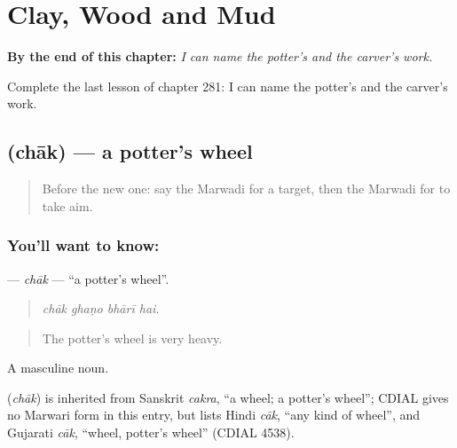 
\chapter{Clay, Wood and Mud}
\label{ch:mw-clay-wood-and-mud}

\begin{chapteropening}
\textbf{By the end of this chapter:} \emph{I can name the potter's and the carver's work.}

Complete the last lesson of chapter 281: I can name the potter's and the carver's work.
\end{chapteropening}

\section[\texorpdfstring{\mw{चाक} (chāk)}{चाक (chāk)}]{ (chāk) — a potter's wheel}

\label{lesson:MW-C281-chak}



\begin{quote}
Before the new one: say the Marwadi for a target, then the Marwadi for to take aim.
\end{quote}

\subsection*{You'll want to know: }
\textbf{} — \emph{chāk} — \textquotedblleft{}a potter's wheel\textquotedblright{}.

\begin{quote}
   
\end{quote}

\begin{quote}
\emph{chāk ghaṇo bhārī hai.}
\end{quote}

\begin{quote}
The potter's wheel is very heavy.
\end{quote}

A masculine noun.

\begin{cousinweb}
\textbf{} (\emph{chāk}) is inherited from Sanskrit \emph{cakra}, \textquotedblleft{}a wheel; a potter's wheel\textquotedblright{}; CDIAL gives no Marwari form in this entry, but lists Hindi \emph{cāk}, \textquotedblleft{}any kind of wheel\textquotedblright{}, and Gujarati \emph{cāk}, \textquotedblleft{}wheel, potter's wheel\textquotedblright{} (CDIAL 4538).
\end{cousinweb}

